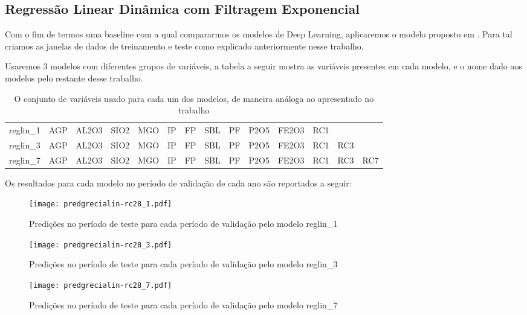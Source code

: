 \subsection{Regressão Linear Dinâmica com Filtragem Exponencial}

Com o fim de termos uma baseline com a qual compararmos os modelos de Deep
Learning, aplicaremos o modelo proposto em \citep{grecialin}.
Para tal criamos as janelas de dados de treinamento e teste
como explicado anteriormente nesse trabalho.  

Usaremos 3 modelos com diferentes grupos de variáveis, a tabela a seguir mostra
as variáveis presentes em cada modelo, e o nome dado aos modelos pelo restante
desse trabalho.


\begin{table}[]
\centering 
\begin{tabular}{llllllllllllll}
\toprule
reglin\_1 &  AGP &  AL2O3 &  SIO2 &  MGO &  IP &  FP &  SBL &  PF &  P2O5 &  FE2O3 &  RC1 &      &      \\
reglin\_3 &  AGP &  AL2O3 &  SIO2 &  MGO &  IP &  FP &  SBL &  PF &  P2O5 &  FE2O3 &  RC1 &  RC3 &      \\
reglin\_7 &  AGP &  AL2O3 &  SIO2 &  MGO &  IP &  FP &  SBL &  PF &  P2O5 &  FE2O3 &  RC1 &  RC3 &  RC7 \\
\bottomrule
\end{tabular}
\caption{O conjunto de variáveis usado para cada um dos modelos, de maneira análoga ao apresentado no trabalho \cite{grecialin}}
\label{tab:modelslin}
\end{table}

Os resultados para cada modelo no período de validação de cada ano são reportados a seguir:

\begin{figure}[H]
  \centering
  \texttt{[image: predgrecialin-rc28\_1.pdf]}
  \caption{Predições no período de teste para cada período de validação pelo
    modelo reglin\_1}
  \label{fig:rc281preds}
\end{figure}

\begin{figure}[H]
  \centering
  \texttt{[image: predgrecialin-rc28\_3.pdf]}
  \caption{Predições no período de teste para cada período de validação pelo
    modelo reglin\_3}
  \label{fig:rc281preds}

\end{figure}
\begin{figure}[H]
  \centering
  \texttt{[image: predgrecialin-rc28\_7.pdf]}
  \caption{Predições no período de teste para cada período de validação pelo
    modelo reglin\_7}
  \label{fig:rc281preds}

\end{figure}

